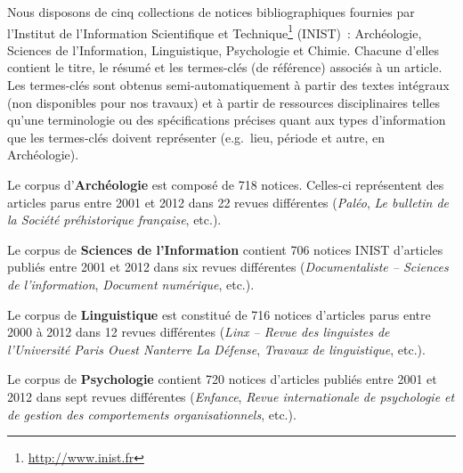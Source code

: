   Nous disposons de cinq collections de notices bibliographiques fournies par
  l'Institut de l’Information Scientifique et
  Technique\footnote{\url{http://www.inist.fr}} (INIST)~: Archéologie, Sciences
  de l'Information, Linguistique, Psychologie et Chimie. Chacune d'elles
  contient le titre, le résumé et les termes-clés (de référence) associés à un
  article. Les termes-clés sont obtenus semi-automatiquement %
  à partir des textes intégraux (non disponibles pour nos travaux) et à partir
  de ressources disciplinaires telles qu'une terminologie ou des spécifications
  précises quant aux types d'information que les termes-clés doivent représenter
  (e.g.~lieu, période et autre, en Archéologie).

  Le corpus d'\textbf{Archéologie} est composé de 718 notices. Celles-ci
  représentent des articles parus entre 2001 et 2012 dans 22 revues différentes
  (\textit{Paléo}, \textit{Le bulletin de la Société préhistorique française},
  etc.).

  Le corpus de \textbf{Sciences de l'Information} contient 706 notices INIST
  d'articles publiés entre 2001 et 2012 dans six revues différentes
  (\textit{Documentaliste -- Sciences de l'information}, \textit{Document
  numérique}, etc.).

  Le corpus de \textbf{Linguistique} est constitué de 716 notices
  d'articles parus entre 2000 à 2012 dans 12 revues différentes
  (\textit{Linx -- Revue des linguistes de l'Université Paris Ouest Nanterre La
  Défense}, \textit{Travaux de linguistique}, etc.).

  Le corpus de \textbf{Psychologie} contient 720 notices d'articles
  publiés entre 2001 et 2012 dans sept revues différentes
  (\textit{Enfance}, \textit{Revue internationale de psychologie et de gestion
  des comportements organisationnels}, etc.).


